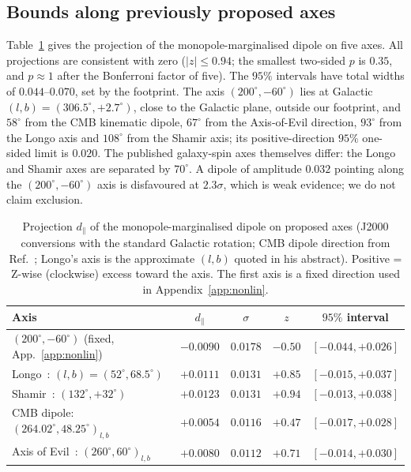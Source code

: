 \documentclass[preprint,12pt]{elsarticle}
\begin{document}
\subsection{Bounds along previously proposed axes}
\label{sec:axes}

Table~\ref{tab:axes} gives the projection of the monopole-marginalised dipole on five axes.
All projections are consistent with zero ($|z|\le 0.94$; the smallest two-sided $p$ is $0.35$, and $p\approx1$ after the Bonferroni factor of five).
The $95\%$ intervals have total widths of $0.044$--$0.070$, set by the footprint.
The axis $(200^\circ,-60^\circ)$ lies at Galactic $(l,b) = (306.5^\circ,+2.7^\circ)$, close to the Galactic plane, outside our footprint, and $58^\circ$ from the CMB kinematic dipole, $67^\circ$ from the Axis-of-Evil direction, $93^\circ$ from the Longo axis and $108^\circ$ from the Shamir axis; its positive-direction $95\%$ one-sided limit is $0.020$.
The published galaxy-spin axes themselves differ: the Longo and Shamir axes are separated by $70^\circ$.
A dipole of amplitude $0.032$ pointing along the $(200^\circ,-60^\circ)$ axis is disfavoured at $2.3\sigma$, which is weak evidence; we do not claim exclusion.

\begin{table}[t]
\caption{\label{tab:axes}Projection $d_\parallel$ of the monopole-marginalised dipole on proposed axes (J2000 conversions with the standard Galactic rotation; CMB dipole direction from Ref.~\cite{Planck2018I}; Longo's axis is the approximate $(l,b)$ quoted in his abstract). Positive = Z-wise (clockwise) excess toward the axis. The first axis is a fixed direction used in Appendix~\ref{app:nonlin}.}
\centering
\footnotesize
\begin{tabular}{lcccc}
\toprule
Axis & $d_\parallel$ & $\sigma$ & $z$ & $95\%$ interval\\
\midrule
$(200^\circ,-60^\circ)$ (fixed, App.~\ref{app:nonlin}) & $-0.0090$ & $0.0178$ & $-0.50$ & $[-0.044,+0.026]$\\
Longo~\cite{Longo2011}: $(l,b)=(52^\circ,68.5^\circ)$ & $+0.0111$ & $0.0131$ & $+0.85$ & $[-0.015,+0.037]$\\
Shamir~\cite{Shamir2012}: $(132^\circ,+32^\circ)$ & $+0.0123$ & $0.0131$ & $+0.94$ & $[-0.013,+0.038]$\\
CMB dipole: $(264.02^\circ,48.25^\circ)_{l,b}$ & $+0.0054$ & $0.0116$ & $+0.47$ & $[-0.017,+0.028]$\\
Axis of Evil~\cite{LandMagueijo2005}: $(260^\circ,60^\circ)_{l,b}$ & $+0.0080$ & $0.0112$ & $+0.71$ & $[-0.014,+0.030]$\\
\bottomrule
\end{tabular}
\end{table}
\end{document}
